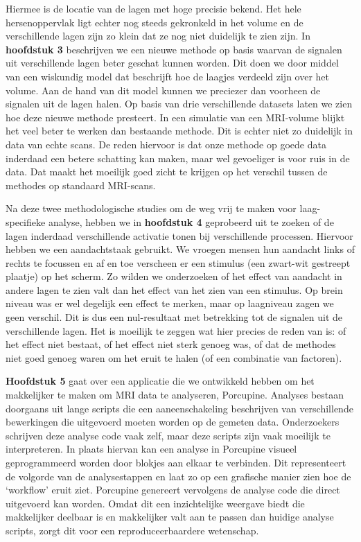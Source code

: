 Hiermee is de locatie van de lagen met hoge precisie bekend. Het hele hersenoppervlak ligt echter nog steeds gekronkeld in het volume en de verschillende lagen zijn zo klein dat ze nog niet duidelijk te zien zijn. In \textbf{hoofdstuk 3} beschrijven we een nieuwe methode op basis waarvan de signalen uit verschillende lagen beter geschat kunnen worden. Dit doen we door middel van een wiskundig model dat beschrijft hoe de laagjes verdeeld zijn over het volume. Aan de hand van dit model kunnen we preciezer dan voorheen de signalen uit de lagen halen. Op basis van drie verschillende datasets laten we zien hoe deze nieuwe methode presteert. In een simulatie van een MRI-volume blijkt het veel beter te werken dan bestaande methode. Dit is echter niet zo duidelijk in data van echte scans. De reden hiervoor is dat onze methode op goede data inderdaad een betere schatting kan maken, maar wel gevoeliger is voor ruis in de data. Dat maakt het moeilijk goed zicht te krijgen op het verschil tussen de methodes op standaard MRI-scans.

Na deze twee methodologische studies om de weg vrij te maken voor laag-specifieke analyse, hebben we in \textbf{hoofdstuk 4} geprobeerd uit te zoeken of de lagen inderdaad verschillende activatie tonen bij verschillende processen. Hiervoor hebben we een aandachtstaak gebruikt. We vroegen mensen hun aandacht links of rechts te focussen en af en toe verscheen er een stimulus (een zwart-wit gestreept plaatje) op het scherm. Zo wilden we onderzoeken of het effect van aandacht in andere lagen te zien valt dan het effect van het zien van een stimulus. Op brein niveau was er wel degelijk een effect te merken, maar op laagniveau zagen we geen verschil. Dit is dus een nul-resultaat met betrekking tot de signalen uit de verschillende lagen. Het is moeilijk te zeggen wat hier precies de reden van is: of het effect niet bestaat, of het effect niet sterk genoeg was, of dat de methodes niet goed genoeg waren om het eruit te halen (of een combinatie van factoren).

\textbf{Hoofdstuk 5} gaat over een applicatie die we ontwikkeld hebben om het makkelijker te maken om MRI data te analyseren, Porcupine. Analyses bestaan doorgaans uit lange scripts die een aaneenschakeling beschrijven van verschillende bewerkingen die uitgevoerd moeten worden op de gemeten data. Onderzoekers schrijven deze analyse code vaak zelf, maar deze scripts zijn vaak moeilijk te interpreteren. In plaats hiervan kan een analyse in Porcupine visueel geprogrammeerd worden door blokjes aan elkaar te verbinden. Dit representeert de volgorde van de analysestappen en laat zo op een grafische manier zien hoe de `workflow' eruit ziet. Porcupine genereert vervolgens de analyse code die direct uitgevoerd kan worden. Omdat dit een inzichtelijke weergave biedt die makkelijker deelbaar is en makkelijker valt aan te passen dan huidige analyse scripts, zorgt dit voor een reproduceerbaardere wetenschap.

